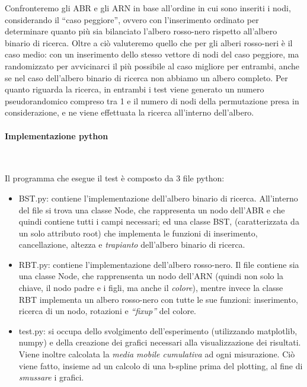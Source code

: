 \documentclass[
]{article}
\providecommand{\tightlist}{%
  \setlength{\itemsep}{0pt}\setlength{\parskip}{0pt}}
\begin{document}
Confronteremo gli ABR e gli ARN in base all'ordine in cui sono inseriti
i nodi, considerando il ``caso peggiore'', ovvero con l'inserimento
ordinato per determinare quanto più sia bilanciato l'albero rosso-nero
rispetto all'albero binario di ricerca. Oltre a ciò valuteremo quello
che per gli alberi rosso-neri è il caso medio: con un inserimento dello
stesso vettore di nodi del caso peggiore, ma randomizzato per
avvicinarci il più possibile al caso migliore per entrambi, anche se nel
caso dell'albero binario di ricerca non abbiamo un albero completo. Per
quanto riguarda la ricerca, in entrambi i test viene generato un numero
pseudorandomico compreso tra 1 e il numero di nodi della permutazione
presa in considerazione, e ne viene effettuata la ricerca all'interno
dell'albero.

\hypertarget{implementazione-python}{%
\paragraph{Implementazione python}\label{implementazione-python}}

\

Il programma che esegue il test è composto da 3 file python:

\begin{itemize}
\tightlist
\item
  BST.py: contiene l'implementazione dell'albero binario di ricerca.  All'interno del file si trova una classe Node, che rappresenta un nodo
  dell'ABR e che quindi contiene tutti i campi necessari; ed una classe  BST, (caratterizzata da un solo attributo root) che implementa le
  funzioni di inserimento, cancellazione, altezza e \emph{trapianto}
  dell'albero binario di ricerca.
\item
  RBT.py: contiene l'implementazione dell'albero rosso-nero. Il file
  contiene sia una classe Node, che rapprensenta un nodo dell'ARN
  (quindi non solo la chiave, il nodo padre e i figli, ma anche il
  \emph{colore}), mentre invece la classe RBT implementa un albero
  rosso-nero con tutte le sue funzioni: inserimento, ricerca di un nodo,
  rotazioni e \emph{``fixup''} del colore.
\item
  test.py: si occupa dello svolgimento dell'esperimento (utilizzando
  matplotlib, numpy) e della creazione dei grafici necessari alla
  visualizzazione dei risultati. Viene inoltre calcolata la \emph{media
  mobile cumulativa} ad ogni misurazione. Ciò viene fatto, insieme ad un
  calcolo di una b-spline prima del plotting, al fine di \emph{smussare}
  i grafici.
\end{itemize}
\end{document}
